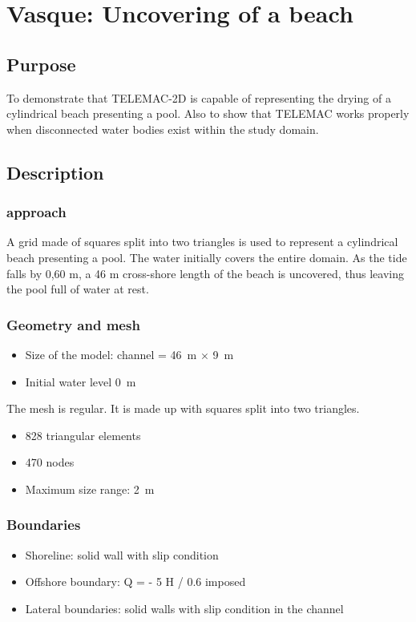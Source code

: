 \chapter{Vasque: Uncovering of  a beach}
\section{Purpose}
To demonstrate that TELEMAC-2D is capable of representing the drying of a
cylindrical beach presenting a pool.
Also to show that TELEMAC works properly when disconnected water bodies exist
within the study domain.

\section{Description}
\subsection{approach}
A grid made of squares split into two triangles is used to represent a
cylindrical beach presenting a pool. The
water initially covers the entire domain. As the tide falls by 0,60 m, a
46 m cross-shore length of the beach is
uncovered, thus leaving the pool full of water at rest.

\subsection{Geometry and mesh}
\begin{itemize}
\item Size of the model: channel = 46~m $\times$ 9~m
\item Initial water level 0~m
\end{itemize}

The mesh is regular. It is made up with squares split into two triangles.
\begin{itemize}
\item 828 triangular elements
\item 470 nodes
\item Maximum size range: 2~m
\end{itemize}

\subsection{Boundaries}

\begin{itemize}
\item Shoreline: solid wall with slip condition
\item Offshore boundary: Q = - 5 H / 0.6 imposed
\item Lateral boundaries: solid walls with slip condition in the channel
  \end{itemize}

